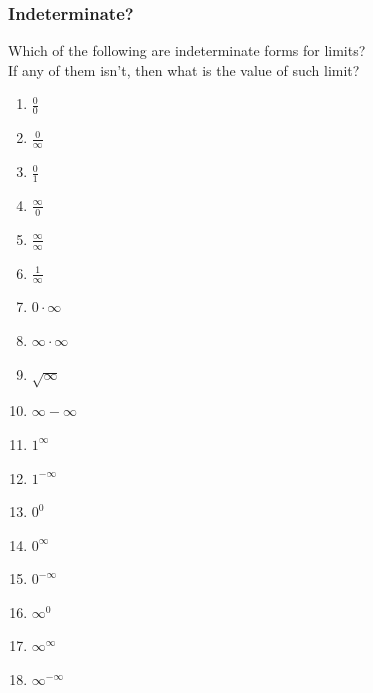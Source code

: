 \documentclass[14pt]{beamer}
\begin{document}
	\begin{frame}[t]
		\frametitle{Indeterminate?}

		Which of the following are indeterminate forms for limits? \\ If any of them
		isn't, then what is the value of such limit?

		\begin{multicols}{4}
			\begin{enumerate}
				\setlength{\itemsep}{1em}

				\item ${\displaystyle \frac{0}{0}}$

				\item ${\displaystyle \frac{0}{\infty}}$

				\item ${\displaystyle \frac{0}{1}}$

				\item ${\displaystyle \frac{\infty}{0}}$

				\item ${\displaystyle \frac{\infty}{\infty}}$

				\item ${\displaystyle \frac{1}{\infty}}$

				\item ${\displaystyle 0 \cdot \infty}$ 

				\item ${\displaystyle \infty \cdot \infty}$ 

				\item ${\displaystyle \sqrt{\infty}}$

				\item ${\displaystyle \infty - \infty}$

				\item ${\displaystyle 1^{\infty}}$

				\item ${\displaystyle 1^{-\infty}}$

				\item ${\displaystyle 0^0}$

				\item ${\displaystyle 0^{\infty}}$

				\item ${\displaystyle 0^{-\infty}}$

				\item ${\displaystyle \infty^0}$

				\item ${\displaystyle \infty^\infty}$

				\item ${\displaystyle \infty^{-\infty}}$
			\end{enumerate}
		\end{multicols}
	\end{frame}
\end{document}
